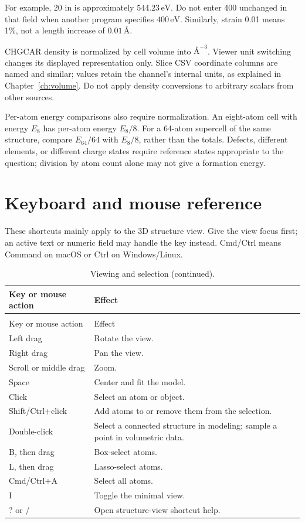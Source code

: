 For example, 20 in  is approximately $544.23\,\mathrm{eV}$. Do not enter 400 unchanged in that field when another program specifies $400\,\mathrm{eV}$. Similarly, strain 0.01 means 1\%, not a length increase of $0.01\,\text{\AA}$.

CHGCAR density is normalized by cell volume into $\text{\AA}^{-3}$. Viewer unit switching changes its displayed representation only. Slice CSV coordinate columns are named  and similar; values retain the channel's internal units, as explained in Chapter~\ref{ch:volume}. Do not apply density conversions to arbitrary scalars from other sources.

Per-atom energy comparisons also require normalization. An eight-atom cell with energy $E_8$ has per-atom energy $E_8/8$. For a 64-atom supercell of the same structure, compare $E_{64}/64$ with $E_8/8$, rather than the totals. Defects, different elements, or different charge states require reference states appropriate to the question; division by atom count alone may not give a formation energy.

\section{Keyboard and mouse reference}

These shortcuts mainly apply to the 3D structure view. Give the view focus first; an active text or numeric field may handle the key instead. Cmd/Ctrl means Command on macOS or Ctrl on Windows/Linux.

\begin{longtable}{>{\raggedright\arraybackslash}p{.37\linewidth}>{\raggedright\arraybackslash}p{}}
\caption{Viewing and selection.}\\
\toprule
Key or mouse action & Effect \\
\midrule
\endfirsthead
\caption[]{Viewing and selection (continued).}\\
\toprule
Key or mouse action & Effect \\
\midrule
\endhead
\bottomrule
\endfoot
\bottomrule
\endlastfoot
Left drag & Rotate the view.\\
Right drag & Pan the view.\\
Scroll or middle drag & Zoom.\\
Space & Center and fit the model.\\
Click & Select an atom or object.\\
Shift/Ctrl+click & Add atoms to or remove them from the selection.\\
Double-click & Select a connected structure in modeling; sample a point in volumetric data.\\
B, then drag & Box-select atoms.\\
L, then drag & Lasso-select atoms.\\
Cmd/Ctrl+A & Select all atoms.\\
I & Toggle the minimal view.\\
? or / & Open structure-view shortcut help.\\
\end{longtable}

